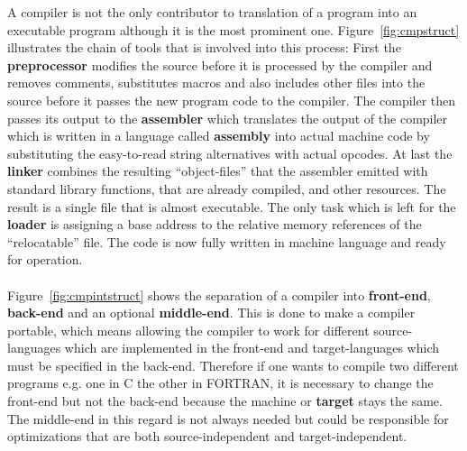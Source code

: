 {A compiler is not the only contributor to translation of a program into an executable program although it is the most prominent one.
Figure~\ref{fig:cmpstruct} illustrates the chain of tools that is involved into this process:
First the \textbf{preprocessor} modifies the source before it is processed by the compiler and removes comments, substitutes macros and also includes other files into the source before it passes the new program code to the compiler.
The compiler then passes its output to the \textbf{assembler} which translates the output of the compiler which is written in a language called \textbf{assembly} into actual machine code by substituting the easy-to-read string alternatives with actual opcodes.
At last the \textbf{linker} combines the resulting ``object-files'' that the assembler emitted with standard library functions, that are already compiled, and other resources. 
The result is a single file that is almost executable.
The only task which is left for the \textbf{loader} is assigning a base address to the relative memory references of the ``relocatable'' file.
The code is now fully written in machine language and ready for operation.
\\
\\
Figure~\ref{fig:cmpintstruct} shows the separation of a compiler into \textbf{front-end}, \textbf{back-end} and an optional \textbf{middle-end}.
This is done to make a compiler portable, which means allowing the compiler to work for different source-languages which are implemented in the front-end and target-languages which must be specified in the back-end.
Therefore if one wants to compile two different programs e.g. one in C the other in FORTRAN, it is necessary to change the front-end but not the back-end because the machine or \textbf{target} stays the same.
The middle-end in this regard is not always needed but could be responsible for optimizations that are both source-independent and target-independent.

}
